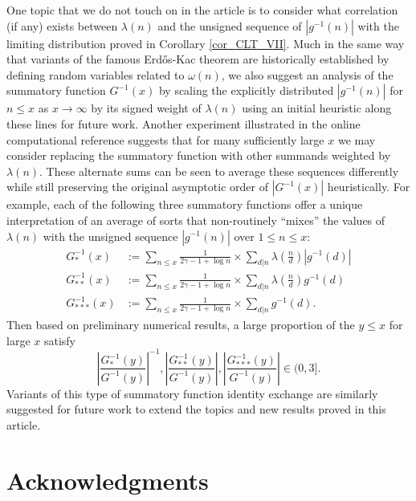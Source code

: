 \documentclass[11pt,reqno,a4letter]{article}
\numberwithin{figure}{section}
\numberwithin{table}{section}
\theoremstyle{plain}
\numberwithin{theorem}{section}
\theoremstyle{definition}
\begin{document}
One topic that we do not touch on in the article is to consider what 
correlation (if any) exists between $\lambda(n)$ and the unsigned sequence of $|g^{-1}(n)|$ 
with the limiting distribution proved in 
Corollary \ref{cor_CLT_VII}. 
Much in the same way that variants of the famous Erd\H{o}s-Kac theorem are historically established 
by defining random variables related to $\omega(n)$, 
we also suggest an analysis of the summatory function $G^{-1}(x)$ by scaling 
the explicitly distributed $|g^{-1}(n)|$ for $n \leq x$ as $x \rightarrow \infty$ by 
its signed weight of $\lambda(n)$ using an initial heuristic along these lines 
for future work. 
Another experiment illustrated in the online computational reference 
\cite{SCHMIDT-MERTENS-COMPUTATIONS} suggests that 
for many sufficiently large $x$ we may consider replacing the 
summatory function with other summands weighted by $\lambda(n)$. 
These alternate sums can be seen to average these sequences differently while still 
preserving the original asymptotic order of $|G^{-1}(x)|$ heuristically. 
For example, each of the following three summatory functions offer a unique 
interpretation of an average of sorts that non-routinely ``mixes'' the values of 
$\lambda(n)$ with the unsigned sequence $|g^{-1}(n)|$ over $1 \leq n \leq x$: 
\begin{align*}
G_{\ast}^{-1}(x) & := \sum_{n \leq x} \frac{1}{2\gamma-1+\log n} \times 
     \sum_{d|n} \lambda\left(\frac{n}{d}\right) |g^{-1}(d)| \\ 
G_{\ast\ast}^{-1}(x) & := \sum_{n \leq x} \frac{1}{2\gamma-1+\log n} \times 
     \sum_{d|n} \lambda\left(\frac{n}{d}\right) g^{-1}(d) \\ 
G_{\ast\ast\ast}^{-1}(x) & := \sum_{n \leq x} \frac{1}{2\gamma-1+\log n} \times 
     \sum_{d|n} g^{-1}(d). 
\end{align*}
Then based on preliminary numerical results, a large proportion of the $y \leq x$ for 
large $x$ satisfy 
\[
     \left\lvert \frac{G_{\ast}^{-1}(y)}{G^{-1}(y)} \right\rvert^{-1}, 
     \left\lvert \frac{G_{\ast\ast}^{-1}(y)}{G^{-1}(y)} \right\rvert, 
     \left\lvert \frac{G_{\ast\ast\ast}^{-1}(y)}{G^{-1}(y)} \right\rvert \in 
     (0, 3]. 
\]
Variants of this type of summatory function identity exchange are similarly 
suggested for future work to extend the topics and new results proved in this article.

\section*{Acknowledgments}
\end{document}

